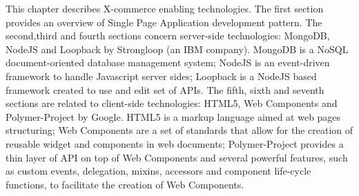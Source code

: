 This chapter describes X-commerce enabling technologies.
The first section provides an overview of Single Page Application development pattern.
The second,third and fourth sections concern server-side technologies: MongoDB, NodeJS and Loopback by Strongloop (an IBM company). MongoDB is a NoSQL document-oriented database management system; NodeJS is an event-driven framework to handle Javascript server sides; Loopback is a NodeJS based framework created to use and edit set of APIs.
The fifth, sixth and seventh sections are related to client-side technologies: HTML5, Web Components and Polymer-Project by Google. HTML5 is a markup language aimed at web pages structuring; Web Components are a set of standards that allow for the creation of reusable widget and components in  web  documents;  Polymer-Project provides a thin layer  of API on top of Web Components and several powerful features, such as custom events, delegation, mixins, accessors and component life-cycle functions, to facilitate the creation of Web  Components.